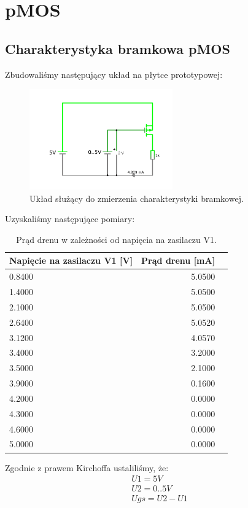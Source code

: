 \documentclass[polish,polish,a4paper]{article}
\begin{document}
\section{pMOS}
\subsection{Charakterystyka bramkowa pMOS}


Zbudowaliśmy następujący układ na płytce prototypowej:
\begin{figure}[H]
\centering
\includegraphics[width=0.55\textwidth]{pmos bramkowa.pdf}
\caption{Układ służący do zmierzenia charakterystyki bramkowej.}
\end{figure}

Uzyskaliśmy następujące pomiary:

\begin{table}[H]\centering
\caption{Prąd drenu w zależności od napięcia na zasilaczu V1.}\label{tab: }
\begin{tabular}{lrr}\toprule
Napięcie na zasilaczu V1 [V] &Prąd drenu [mA] \\\midrule
0.8400 &5.0500 \\
1.4000 &5.0500 \\
2.1000 &5.0500 \\
2.6400 &5.0520 \\
3.1200  &4.0570 \\
3.4000 &3.2000 \\
3.5000 &2.1000 \\
3.9000 &0.1600 \\
4.2000 &0.0000 \\
4.3000 &0.0000 \\
4.6000 &0.0000 \\
5.0000 &0.0000 \\
\bottomrule
\end{tabular}
\end{table}

Zgodnie z prawem Kirchoffa ustaliliśmy, że:
\begin{gather}
U1 = 5V \\
U2 = 0..5V \\
Ugs = U2 - U1 
\end{gather}
\end{document}
